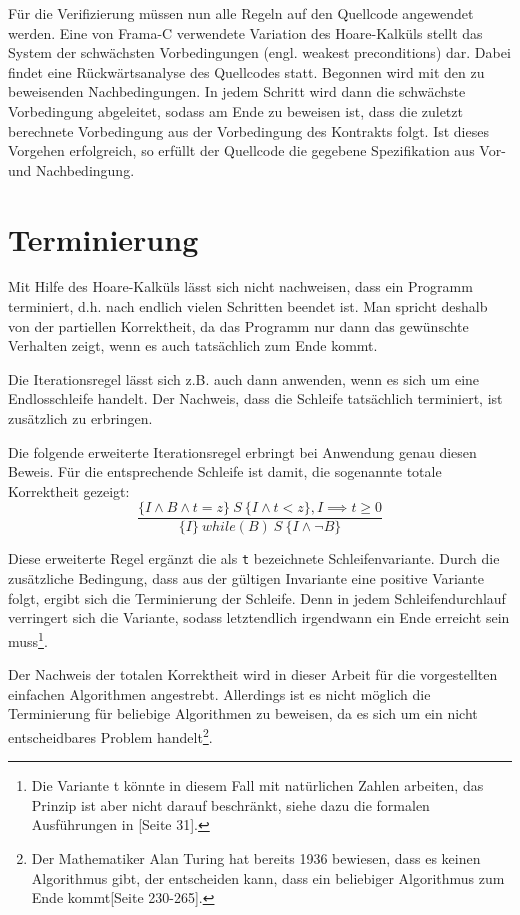 Für die Verifizierung müssen nun alle Regeln auf den Quellcode angewendet werden. Eine von Frama-C verwendete Variation des Hoare-Kalküls
stellt das System der schwächsten Vorbedingungen (engl. weakest preconditions) dar. Dabei findet eine Rückwärtsanalyse
des Quellcodes statt. Begonnen wird mit den zu beweisenden Nachbedingungen. In jedem Schritt wird dann die schwächste Vorbedingung
abgeleitet, sodass am Ende zu beweisen ist, dass die zuletzt berechnete Vorbedingung aus der Vorbedingung des Kontrakts folgt.
Ist dieses Vorgehen erfolgreich, so erfüllt der Quellcode die gegebene Spezifikation aus Vor- und Nachbedingung.

\section{Terminierung}

Mit Hilfe des Hoare-Kalküls lässt sich nicht nachweisen, dass ein Programm terminiert, d.h. nach endlich vielen Schritten 
beendet ist. Man spricht deshalb von der partiellen Korrektheit, da das Programm nur dann das gewünschte 
Verhalten zeigt, wenn es auch tatsächlich zum Ende kommt.

Die Iterationsregel lässt sich z.B. auch dann anwenden, wenn es sich um eine Endlosschleife handelt. Der Nachweis,
dass die Schleife tatsächlich terminiert, ist zusätzlich zu erbringen. 

Die folgende erweiterte Iterationsregel erbringt bei Anwendung genau diesen Beweis. Für die entsprechende Schleife ist damit, die
sogenannte totale Korrektheit gezeigt:
\begin{displaymath}
\frac{\{I \land B \land t = z \} \:S\: \{I \land t < z\}, I \implies t \geq 0}{\{I\}\: while(B)\: S\: \{I \land \neg B\}}
\end{displaymath}

Diese erweiterte Regel ergänzt die als \lstinline{t} bezeichnete Schleifenvariante. Durch die zusätzliche Bedingung, dass aus der gültigen Invariante
eine positive Variante folgt, ergibt sich die Terminierung der Schleife. Denn in jedem Schleifendurchlauf verringert sich die Variante,
sodass letztendlich irgendwann ein Ende erreicht sein muss\footnote{Die Variante t könnte in diesem Fall mit natürlichen Zahlen arbeiten,
das Prinzip ist aber nicht darauf beschränkt, siehe dazu die formalen Ausführungen in \cite{floyd}[Seite 31].}.

Der Nachweis der totalen Korrektheit wird in dieser Arbeit für die vorgestellten einfachen Algorithmen angestrebt.
Allerdings ist es nicht möglich die Terminierung für beliebige Algorithmen zu beweisen, da es sich um ein nicht entscheidbares 
Problem handelt\footnote{Der Mathematiker Alan Turing hat bereits 1936 bewiesen, dass es keinen Algorithmus gibt, der 
entscheiden kann, dass ein beliebiger Algorithmus zum Ende kommt\cite{turing}[Seite 230-265].}.

